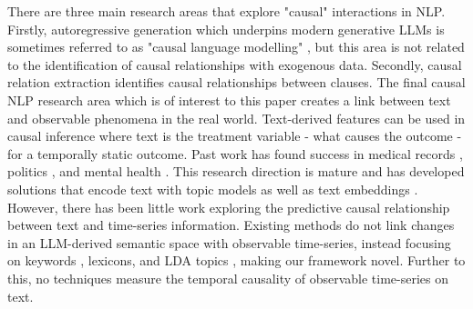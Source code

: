 There are three main research areas that explore "causal" interactions in NLP. Firstly, autoregressive generation which underpins modern generative LLMs is sometimes referred to as "causal language modelling" \cite{Radford2018, Radford2019, Brown2020}, but this area is not related to the identification of causal relationships with exogenous data. Secondly, causal relation extraction \cite{ning-etal-2018-joint, dasgupta-etal-2018-automatic-extraction, Yang2021ASO} identifies causal relationships between clauses. The final causal NLP research area which is of interest to this paper creates a link between text and observable phenomena in the real world. Text-derived features can be used in causal inference where text is the treatment variable - what causes the outcome - for a temporally static outcome. Past work has found success in medical records \cite{Zeng2021UncoveringIP}, politics \cite{fong-grimmer-2016-discovery}, and mental health \cite{zhang2020quantifying}. This research direction is mature and has developed solutions that encode text with topic models \cite{roberts2020adjusting} as well as text embeddings \cite{Veitch2019AdaptingTE}. However, there has been little work exploring the predictive causal relationship between text and time-series information. Existing methods do not link changes in an LLM-derived semantic space with observable time-series, instead focusing on keywords \cite{balashankar-etal-2019-identifying, Maisonnave2022CausalGE}, lexicons, and LDA topics \cite{kang-etal-2017-detecting}, making our framework novel. Further to this, no techniques measure the temporal causality of observable time-series on text.
\vspace{-0.1cm}